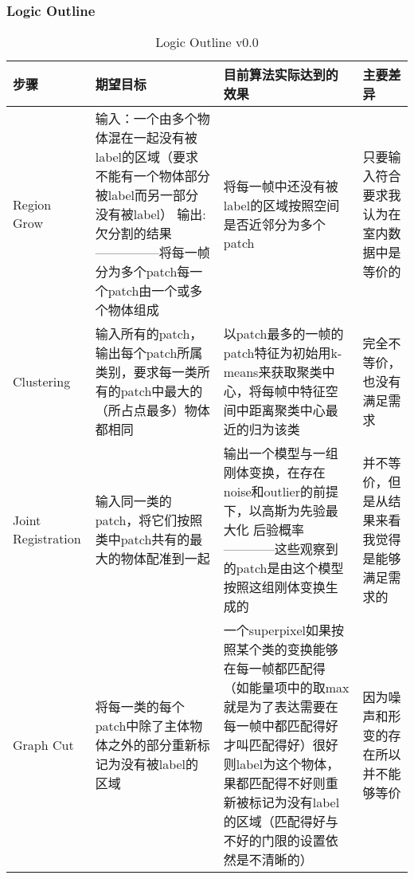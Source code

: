 \subsubsection{Logic Outline}
\begin{table*}[!hbp]
	\begin{tabular}{p{}|p{}|p{}|p{}}
		\hline
		步骤 & 期望目标 & 目前算法实际达到的效果 & 主要差异\\
		\hline
		Region Grow 
		& 输入：一个由多个物体混在一起没有被label的区域（要求不能有一个物体部分被label而另一部分没有被label）
		输出:欠分割的结果—————将每一帧分为多个patch每一个patch由一个或多个物体组成 
		& 将每一帧中还没有被label的区域按照空间是否近邻分为多个patch 
		& 只要输入符合要求我认为在室内数据中是等价的
		\\
		\hline
		Clustering
		& 输入所有的patch， 输出每个patch所属类别，要求每一类所有的patch中最大的（所占点最多）物体都相同
		& 以patch最多的一帧的patch特征为初始用k-means来获取聚类中心，将每帧中特征空间中距离聚类中心最近的归为该类
		& 完全不等价，也没有满足需求\\
		\hline
		Joint Registration 
		& 输入同一类的patch，将它们按照类中patch共有的最大的物体配准到一起 
		& 输出一个模型与一组刚体变换，在存在noise和outlier的前提下，以高斯为先验最大化 后验概率————这些观察到的patch是由这个模型按照这组刚体变换生成的  
		& 并不等价，但是从结果来看我觉得是能够满足需求的 \\
		\hline
		Graph Cut
		& 将每一类的每个patch中除了主体物体之外的部分重新标记为没有被label的区域
		& 一个superpixel如果按照某个类的变换能够在每一帧都匹配得（如能量项中的取max就是为了表达需要在每一帧中都匹配得好才叫匹配得好）很好则label为这个物体，果都匹配得不好则重新被标记为没有label的区域（匹配得好与不好的门限的设置依然是不清晰的）
		& 因为噪声和形变的存在所以并不能够等价
	\end{tabular}
	\caption{Logic Outline v0.0} %
	\label{tab:logic_outline00}
\end{table*}

